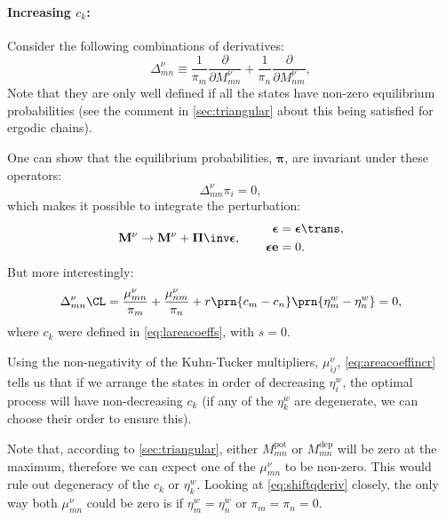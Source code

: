 \documentclass[12pt]{article}
\newcommand{\onev}{\mathbf{e}}
\newcommand{\eqm}{\pi}
\newcommand{\eq}{\boldsymbol{\eqm}}
\newcommand{\Eqm}{\Pi}
\newcommand{\Eq}{\boldsymbol{\Eqm}}
\newcommand{\etwm}{\eta^w}
\newcommand{\MMdm}{M}
\newcommand{\MMd}{\mathbf{\MMdm}}
\newcommand{\pot}{^{\text{pot}}}
\newcommand{\dep}{^{\text{dep}}}
\renewcommand{\pdiff}[2]{\frac{\partial #1}{\partial #2}}
\begin{document}
\paragraph{Increasing \texorpdfstring{$c_k$}{c(k)}:}\label{sec:areacoeffincr}

Consider the following combinations of derivatives:
%
\begin{equation}\label{eq:areacoeffincrderiv}
    \Delta^\nu_{mn} \equiv
      \frac{1}{\eqm_m} \pdiff{}{\MMdm^\nu_{mn}}
      + \frac{1}{\eqm_n} \pdiff{}{\MMdm^\nu_{nm}}, 
\end{equation}
%
Note that they are only well defined if all the states have non-zero equilibrium probabilities (see the comment in \cref{sec:triangular} about this being satisfied for ergodic chains).

One can show that the equilibrium probabilities, $\eq$, are invariant under these operators:
%
\begin{equation}\label{eq:sareacoeffincrprob}
  \Delta^\nu_{mn} \eqm_i = 0,
\end{equation}
%
which makes it possible to integrate the perturbation:
%
\begin{equation}\label{eq:areacoeffincrfinite}
  \MMd^\nu \to \MMd^\nu + \Eq\inv \boldsymbol{\epsilon},
  \qquad
  \begin{aligned}
  \boldsymbol{\epsilon} &= \boldsymbol{\epsilon}\trans,
  \\
  \boldsymbol{\epsilon} \onev &= 0.
  \end{aligned}
\end{equation}
%
But more interestingly:
%
\begin{equation}\label{eq:areacoeffincr}
    \Delta^\nu_{mn}\CL =
      \frac{\mu^\nu_{mn}}{\eqm_m} + \frac{\mu^\nu_{nm}}{\eqm_n}
      + r \prn{c_m - c_n}\prn{\etwm_m - \etwm_n} = 0,
\end{equation}
%
where $c_k$ were defined in \cref{eq:lareacoeffs}, with \(s = 0\).

Using the non-negativity of the Kuhn-Tucker multipliers, $\mu^\nu_{ij}$, \cref{eq:areacoeffincr} tells us that if we arrange the states in order of decreasing $\etwm_i$, the optimal process will have non-decreasing $c_k$ (if any of the $\etwm_k$ are degenerate, we can choose their order to ensure this).

Note that, according to \cref{sec:triangular}, either $\MMdm\pot_{mn}$ or $\MMdm\dep_{mn}$ will be zero at the maximum, therefore we can expect one of the $\mu^\nu_{mn}$ to be non-zero.
This would rule out degeneracy of the $c_k$ or $\etwm_k$.
Looking at \cref{eq:shiftqderiv} closely, the only way both $\mu^\nu_{mn}$ could be zero is if $\etwm_m = \etwm_n$ or $\eqm_m = \eqm_n = 0$.
\end{document}
